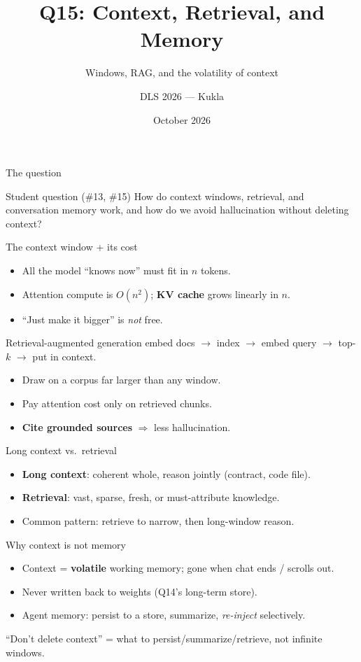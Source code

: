 \documentclass[aspectratio=169,10pt]{beamer}
\title{Q15: Context, Retrieval, and Memory}
\subtitle{Windows, RAG, and the volatility of context}
\author{DLS 2026 --- Kukla}
\date{October 2026}
\begin{document}
\maketitle

\begin{frame}{The question}
\begin{block}{Student question (\#13, \#15)}
How do context windows, retrieval, and conversation memory work, and how do we avoid hallucination without
deleting context?
\end{block}
\end{frame}
\begin{frame}{The context window + its cost}
\begin{itemize}
\item All the model ``knows now'' must fit in $n$ tokens.
\item Attention compute is $O(n^2)$; \textbf{KV cache} grows linearly in $n$.
\item ``Just make it bigger'' is \emph{not} free.
\end{itemize}
\end{frame}
\begin{frame}{Retrieval-augmented generation}
embed docs $\to$ index $\to$ embed query $\to$ top-$k$ $\to$ put in context.
\begin{itemize}
\item Draw on a corpus far larger than any window.
\item Pay attention cost only on retrieved chunks.
\item \textbf{Cite grounded sources} $\Rightarrow$ less hallucination.
\end{itemize}
\end{frame}
\begin{frame}{Long context vs.\ retrieval}
\begin{itemize}
\item \textbf{Long context}: coherent whole, reason jointly (contract, code file).
\item \textbf{Retrieval}: vast, sparse, fresh, or must-attribute knowledge.
\item Common pattern: retrieve to narrow, then long-window reason.
\end{itemize}
\end{frame}
\begin{frame}{Why context is not memory}
\begin{itemize}
\item Context = \textbf{volatile} working memory; gone when chat ends / scrolls out.
\item Never written back to weights (Q14's long-term store).
\item Agent memory: persist to a store, summarize, \emph{re-inject} selectively.
\end{itemize}
\alert{``Don't delete context'' = what to persist/summarize/retrieve, not infinite windows.}
\end{frame}
\end{document}
